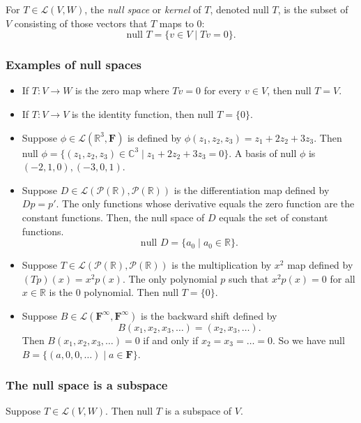 \documentclass[11pt]{article}
\begin{document}
    For \(T \in \mathcal{L}(V,W)\), the \emph{null space} or \emph{kernel} of $T$, denoted null $T$, is the subset of $V$ consisting of those vectors that $T$ maps to 0: \[\text{null } T = \{v \in V \mid Tv = 0\}.\]

    \subsubsection{Examples of null spaces}

    \begin{itemize}
        \item If \(T:V \rightarrow W\) is the zero map where \(Tv = 0\) for every \(v \in V\), then null \(T = V\). 
        \item If \(T:V \rightarrow V\) is the identity function, then null \(T = \{0\}\). 
        \item Suppose \(\phi \in \mathcal{L}(\mathbb{R}^3, \textbf{F})\) is defined by \(\phi (z_1, z_2, z_3) = z_1 + 2z_2 + 3z_3\). Then null \(\phi = \{(z_1, z_2, z_3) \in \mathbb{C}^3 \mid z_1 + 2 z_2 + 3 z_3 = 0\}.\) A basis of null \(\phi\) is \((-2,1,0), (-3,0,1)\). 
        \item Suppose \(D \in \mathcal{L}(\mathcal{P}(\mathbb{R}), \mathcal{P}(\mathbb{R}))\) is the differentiation map defined by \(Dp = p'\). The only functions whose derivative equals the zero function are the constant functions. Then, the null space of $D$ equals the set of constant functions. \[\text{null } D = \{ a_0 \mid a_0 \in \mathbb{R} \}.\]
        \item Suppose \(T \in \mathcal{L}(\mathcal{P}(\mathbb{R}), \mathcal{P}(\mathbb{R}))\) is the multiplication by \(x^2\) map defined by \((Tp)(x) = x^2 p(x)\). The only polynomial $p$ such that \(x^2 p(x) = 0\) for all \(x \in \mathbb{R}\) is the 0 polynomial. Then null \(T = \{0\}\). 
        \item Suppose \(B \in \mathcal{L}(\textbf{F}^{\infty}, \textbf{F}^{\infty})\) is the backward shift defined by \[ B(x_1, x_2, x_3, \dots) = (x_2, x_3, \dots).\] Then \(B(x_1,x_2,x_3,\dots) = 0\) if and only if \(x_2 = x_3 = \dots = 0\). So we have null \(B = \{ (a,0,0,\dots) \mid a \in \textbf{F} \}\). 
    \end{itemize}

    \subsubsection{The null space is a subspace}

    Suppose \(T \in \mathcal{L}(V,W)\). Then null \(T\) is a subspace of $V$.
\end{document}

